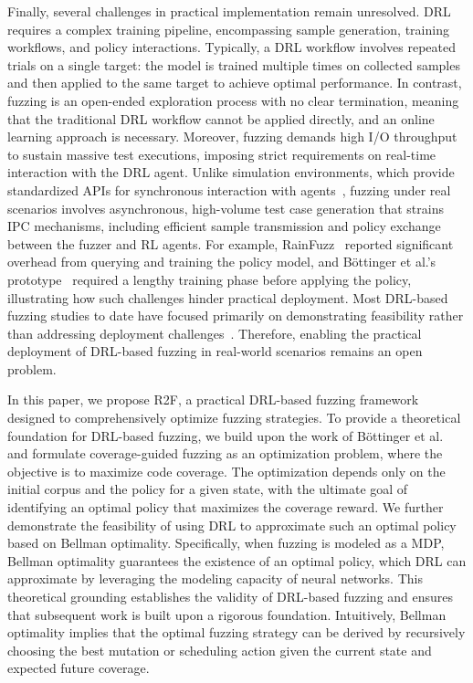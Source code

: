\documentclass[lettersize,journal]{IEEEtran}
\begin{document}
Finally, several challenges in practical implementation remain unresolved. DRL requires a complex training pipeline, encompassing sample generation, training workflows, and policy interactions. Typically, a DRL workflow involves repeated trials on a single target: the model is trained multiple times on collected samples and then applied to the same target to achieve optimal performance. In contrast, fuzzing is an open-ended exploration process with no clear termination, meaning that the traditional DRL workflow cannot be applied directly, and an online learning approach is necessary. Moreover, fuzzing demands high I/O throughput to sustain massive test executions, imposing strict requirements on real-time interaction with the DRL agent. Unlike simulation environments, which provide standardized APIs for synchronous interaction with agents~\cite{towersGymnasiumStandardInterface2024,drozdFuzzerGymCompetitiveFramework2018}, fuzzing under real scenarios involves asynchronous, high-volume test case generation that strains IPC mechanisms, including efficient sample transmission and policy exchange between the fuzzer and RL agents. For example, RainFuzz~\cite{binosiRainfuzzReinforcementlearningDriven2023} reported significant overhead from querying and training the policy model, and Böttinger et al.’s prototype~\cite{bottingerDeepReinforcementFuzzing2018} required a lengthy training phase before applying the policy, illustrating how such challenges hinder practical deployment. Most DRL-based fuzzing studies to date have focused primarily on demonstrating feasibility rather than addressing deployment challenges~\cite{bottingerDeepReinforcementFuzzing2018,binosiRainfuzzReinforcementlearningDriven2023,gongDRLFCfuzzerFuzzingDeepReinforcementLearning2022}. Therefore, enabling the practical deployment of DRL-based fuzzing in real-world scenarios remains an open problem.

In this paper, we propose R2F, a practical DRL-based fuzzing framework designed to comprehensively optimize fuzzing strategies. To provide a theoretical foundation for DRL-based fuzzing, we build upon the work of Böttinger et al.~\cite{bottingerDeepReinforcementFuzzing2018} and formulate coverage-guided fuzzing as an optimization problem, where the objective is to maximize code coverage. The optimization depends only on the initial corpus and the policy for a given state, with the ultimate goal of identifying an optimal policy that maximizes the coverage reward. We further demonstrate the feasibility of using DRL to approximate such an optimal policy based on Bellman optimality. Specifically, when fuzzing is modeled as a MDP, Bellman optimality guarantees the existence of an optimal policy, which DRL can approximate by leveraging the modeling capacity of neural networks. This theoretical grounding establishes the validity of DRL-based fuzzing and ensures that subsequent work is built upon a rigorous foundation. Intuitively, Bellman optimality implies that the optimal fuzzing strategy can be derived by recursively choosing the best mutation or scheduling action given the current state and expected future coverage.
\end{document}
